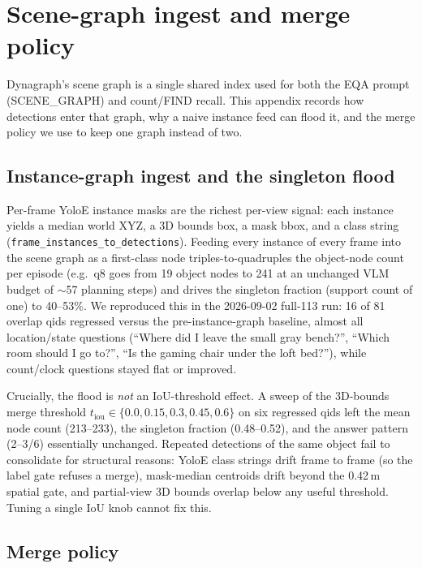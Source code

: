 \section{Scene-graph ingest and merge policy}
\label{app:graph_fusion_policy}

Dynagraph's scene graph is a single shared index used for both the EQA prompt
(SCENE\_GRAPH) and count/FIND recall. This appendix records how detections enter
that graph, why a naive instance feed can flood it, and the merge policy we use to
keep one graph instead of two.

\subsection{Instance-graph ingest and the singleton flood}
\label{app:instance_flood}

Per-frame YoloE instance masks are the richest per-view signal: each instance yields a
median world XYZ, a 3D bounds box, a mask bbox, and a class string
(\texttt{frame\_instances\_to\_detections}). Feeding every instance of every frame
into the scene graph as a first-class node triples-to-quadruples the object-node count
per episode (e.g.\ q8 goes from 19 object nodes to 241 at an unchanged VLM budget of
$\sim$57 planning steps) and drives the singleton fraction (support count of one) to
40--53\%. We reproduced this in the 2026-09-02 full-113 run: 16 of 81 overlap qids
regressed versus the pre-instance-graph baseline, almost all location/state questions
(``Where did I leave the small gray bench?'', ``Which room should I go to?'',
``Is the gaming chair under the loft bed?''), while count/clock questions stayed flat
or improved.

Crucially, the flood is \emph{not} an IoU-threshold effect. A sweep of the 3D-bounds
merge threshold $t_{\text{iou}}\in\{0.0,0.15,0.3,0.45,0.6\}$ on six regressed qids left
the mean node count (213--233), the singleton fraction (0.48--0.52), and the answer
pattern (2--3/6) essentially unchanged. Repeated detections of the same object fail to
consolidate for structural reasons: YoloE class strings drift frame to frame (so the
label gate refuses a merge), mask-median centroids drift beyond the 0.42\,m spatial
gate, and partial-view 3D bounds overlap below any useful threshold. Tuning a single
IoU knob cannot fix this.

\subsection{Merge policy}
\label{app:merge_policy}

